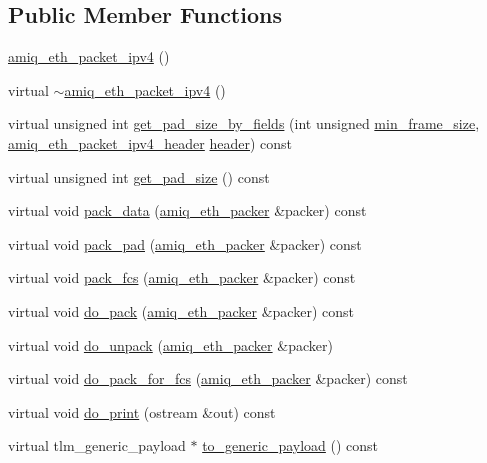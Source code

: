 \subsection*{Public Member Functions}
\begin{DoxyCompactItemize}
\item 
\hyperlink{classamiq__eth__packet__ipv4_ae65fecb0be5e741a21db65015c05afa9}{amiq\_\-eth\_\-packet\_\-ipv4} ()
\item 
virtual \hyperlink{classamiq__eth__packet__ipv4_abfc12e657f4ec983b98868e43da66977}{$\sim$amiq\_\-eth\_\-packet\_\-ipv4} ()
\item 
virtual unsigned int \hyperlink{classamiq__eth__packet__ipv4_af92a061a75e5ab1a6406f3dae1000b45}{get\_\-pad\_\-size\_\-by\_\-fields} (int unsigned \hyperlink{classamiq__eth__packet_a4e1eca2891cd445b62dbd17a98a5fc22}{min\_\-frame\_\-size}, \hyperlink{classamiq__eth__packet__ipv4__header}{amiq\_\-eth\_\-packet\_\-ipv4\_\-header} \hyperlink{classamiq__eth__packet__ipv4_af1028494effe0d4be6fd2f57088de03e}{header}) const 
\item 
virtual unsigned int \hyperlink{classamiq__eth__packet__ipv4_ae2b9fabf7983bced45ccfe392d0c1e95}{get\_\-pad\_\-size} () const 
\item 
virtual void \hyperlink{classamiq__eth__packet__ipv4_ab9ba03ff0d5aafd804c64001871a7a75}{pack\_\-data} (\hyperlink{classamiq__eth__packer}{amiq\_\-eth\_\-packer} \&packer) const 
\item 
virtual void \hyperlink{classamiq__eth__packet__ipv4_a5f525dd46092d237056f2c27901467f8}{pack\_\-pad} (\hyperlink{classamiq__eth__packer}{amiq\_\-eth\_\-packer} \&packer) const 
\item 
virtual void \hyperlink{classamiq__eth__packet__ipv4_abc9d3857d1f9355c5057cb4d2825e7ea}{pack\_\-fcs} (\hyperlink{classamiq__eth__packer}{amiq\_\-eth\_\-packer} \&packer) const 
\item 
virtual void \hyperlink{classamiq__eth__packet__ipv4_a8130e24da66bbd16c4edc7b6a608a5e9}{do\_\-pack} (\hyperlink{classamiq__eth__packer}{amiq\_\-eth\_\-packer} \&packer) const 
\item 
virtual void \hyperlink{classamiq__eth__packet__ipv4_af85e08566b37953edee4566c40400f05}{do\_\-unpack} (\hyperlink{classamiq__eth__packer}{amiq\_\-eth\_\-packer} \&packer)
\item 
virtual void \hyperlink{classamiq__eth__packet__ipv4_a9292f2b244e6baae39ba4aeea7b97e8f}{do\_\-pack\_\-for\_\-fcs} (\hyperlink{classamiq__eth__packer}{amiq\_\-eth\_\-packer} \&packer) const 
\item 
virtual void \hyperlink{classamiq__eth__packet__ipv4_a5e93e2455918061cdc524f30626d4043}{do\_\-print} (ostream \&out) const 
\item 
virtual tlm\_\-generic\_\-payload $\ast$ \hyperlink{classamiq__eth__packet__ipv4_aefadeb6546366f09657c03790fe4ce90}{to\_\-generic\_\-payload} () const 
\end{DoxyCompactItemize}
